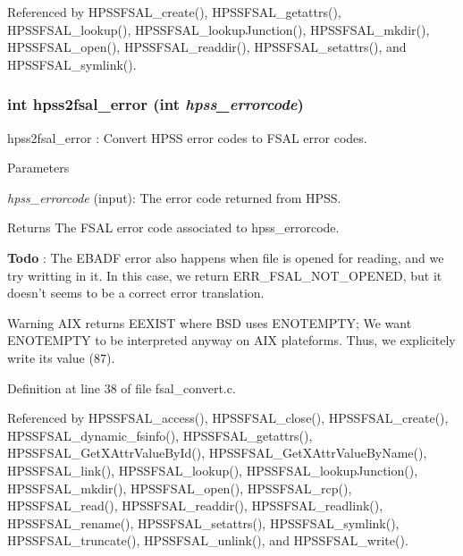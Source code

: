 Referenced by HPSSFSAL\_\-create(), HPSSFSAL\_\-getattrs(), HPSSFSAL\_\-lookup(), HPSSFSAL\_\-lookupJunction(), HPSSFSAL\_\-mkdir(), HPSSFSAL\_\-open(), HPSSFSAL\_\-readdir(), HPSSFSAL\_\-setattrs(), and HPSSFSAL\_\-symlink().
\subsubsection[{hpss2fsal\_\-error}]{\setlength{\rightskip}{0pt plus 5cm}int hpss2fsal\_\-error (int {\em hpss\_\-errorcode})}\label{fsal__convert_8c_a6348179c6dd9f68021108a1e7b1b53bc}
hpss2fsal\_\-error : Convert HPSS error codes to FSAL error codes.


\begin{DoxyParams}{Parameters}
\item[{\em hpss\_\-errorcode}](input): The error code returned from HPSS.\end{DoxyParams}
\begin{DoxyReturn}{Returns}
The FSAL error code associated to hpss\_\-errorcode. 
\end{DoxyReturn}


\begin{Desc}
\item[{\bf Todo}]: The EBADF error also happens when file is opened for reading, and we try writting in it. In this case, we return ERR\_\-FSAL\_\-NOT\_\-OPENED, but it doesn't seems to be a correct error translation. \end{Desc}


\begin{DoxyWarning}{Warning}
AIX returns EEXIST where BSD uses ENOTEMPTY; We want ENOTEMPTY to be interpreted anyway on AIX plateforms. Thus, we explicitely write its value (87).
\end{DoxyWarning}


Definition at line 38 of file fsal\_\-convert.c.

Referenced by HPSSFSAL\_\-access(), HPSSFSAL\_\-close(), HPSSFSAL\_\-create(), HPSSFSAL\_\-dynamic\_\-fsinfo(), HPSSFSAL\_\-getattrs(), HPSSFSAL\_\-GetXAttrValueById(), HPSSFSAL\_\-GetXAttrValueByName(), HPSSFSAL\_\-link(), HPSSFSAL\_\-lookup(), HPSSFSAL\_\-lookupJunction(), HPSSFSAL\_\-mkdir(), HPSSFSAL\_\-open(), HPSSFSAL\_\-rcp(), HPSSFSAL\_\-read(), HPSSFSAL\_\-readdir(), HPSSFSAL\_\-readlink(), HPSSFSAL\_\-rename(), HPSSFSAL\_\-setattrs(), HPSSFSAL\_\-symlink(), HPSSFSAL\_\-truncate(), HPSSFSAL\_\-unlink(), and HPSSFSAL\_\-write().
